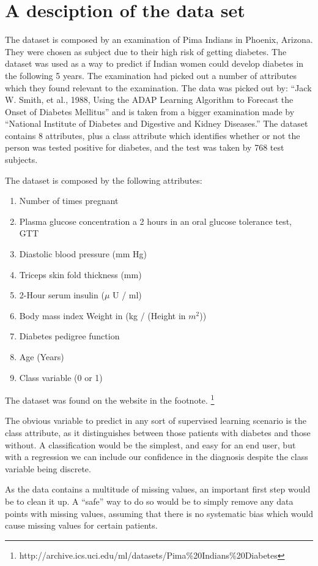 \section{A desciption of the data set}

The dataset is composed by an examination of Pima Indians in Phoenix, Arizona.
They were chosen as subject due to their high risk of getting diabetes.
The dataset was used as a way to predict if Indian women could develop diabetes in the following 5 years.
The examination had picked out a number of attributes which they found relevant to the examination.
The data was picked out by: ``Jack W. Smith, et al., 1988, Using the ADAP Learning Algorithm to Forecast the Onset of Diabetes Mellitus''
and is taken from a bigger examination made by ``National Institute of Diabetes and Digestive and Kidney Diseases.''
The dataset contains 8 attributes, plus a class attribute which identifies whether or not the person was tested positive for diabetes,
 and the test was taken by 768 test subjects.

The dataset is composed by the following attributes:
\begin{enumerate}
\item Number of times pregnant
\item Plasma glucose concentration a 2 hours in an oral glucose tolerance test, GTT
\item Diastolic blood pressure (mm Hg)
\item Triceps skin fold thickness (mm)
\item 2-Hour serum insulin ($\mu$ U / ml)
\item Body mass index Weight in (kg / (Height in $m^2$))
\item Diabetes pedigree function
\item Age (Years)
\item Class variable (0 or 1)
\end{enumerate}

The dataset was found on the website in the footnote.
\footnote{http://archive.ics.uci.edu/ml/datasets/Pima\%20Indians\%20Diabetes}

The obvious variable to predict
in any sort of supervised learning scenario
is the class attribute,
as it distinguishes between
those patients with diabetes and those without.
A classification would be the simplest,
and easy for an end user,
but with a regression
we can include our confidence in the diagnosis
despite the class variable being discrete.

As the data contains a multitude of missing values,
an important first step would be to clean it up.
A ``safe'' way to do so would be to simply remove any data points
with missing values,
assuming that there is no systematic bias
which would cause missing values for certain patients.

